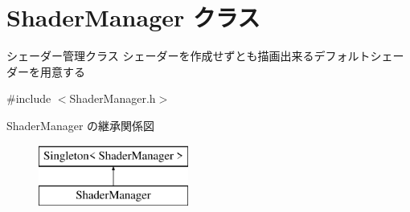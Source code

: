 \hypertarget{class_d3_d11_1_1_graphic_1_1_shader_manager}{}\section{Shader\+Manager クラス}
\label{class_d3_d11_1_1_graphic_1_1_shader_manager}


シェーダー管理クラス  シェーダーを作成せずとも描画出来るデフォルトシェーダーを用意する  




{\ttfamily \#include $<$Shader\+Manager.\+h$>$}

Shader\+Manager の継承関係図\begin{figure}[H]
\begin{center}
\leavevmode
\includegraphics[height=2.000000cm]{class_d3_d11_1_1_graphic_1_1_shader_manager}
\end{center}
\end{figure}
